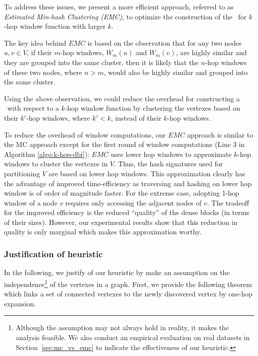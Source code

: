 To address these issues, we present a more efficient approach,
referred to as {\it Estimated Min-hash Clustering (EMC)}, 
to optimize the construction of the \DBIndex\ for $k$-hop window function with larger $k$.

The key idea behind $EMC$ is based on the observation that for any two nodes $u, v \in V$,
if their $m$-hop windows, $W_m(u)$ and $W_m(v)$, are highly similar 
and they are grouped into the same cluster, 
then it is likely that the $n$-hop windows of these two nodes, where $n > m$,
would also be highly similar and grouped into the same cluster.

Using the above observation, we could reduce the overhead for constructing a \DBIndex\ with
respect to a $k$-hop window 
function by clustering the vertexes based on their $k'$-hop windows, where $k' < k$, instead of their $k$-hop windows.

To reduce the overhead of window computations,
our $EMC$ approach is similar to the MC approach except   
for the first round of window computations
(Line 3 in Algorithm \ref{algo:k-hop-dbi}):
$EMC$ uses lower hop windows to approximate $k$-hop windows 
to cluster the vertexes in $V$.
Thus, the hash signatures used for partitioning 
$V$ are based on lower hop windows.
This approximation clearly has the advantage of improved 
time-efficiency as traversing and hashing on lower hop window is of
order of magnitude faster. 
For the extreme case, adopting 1-hop window of a node $v$ requires only accessing the adjacent nodes of $v$. 
The tradeoff for the improved efficiency is the reduced ``quality''
of the dense blocks (in terms of their sizes).
However, our experimental results show that this reduction in 
quality is only marginal which makes this approximation worthy.

\subsubsection{Justification of heuristic}
In the following, we justify of our heuristic by make
an assumption on the independence\footnote{Although the assumption may not always hold in reality, it makes the analysis feasible. We also conduct an empirical evaluation on real datasets in Section~\ref{sec:mc_vs_emc} to indicate the effectiveness of our heuristic.} of the 
vertexes in a graph. First, we provide the following theorem which
links a set of connected vertexes to the newly discovered vertex by one-hop
expansion.

